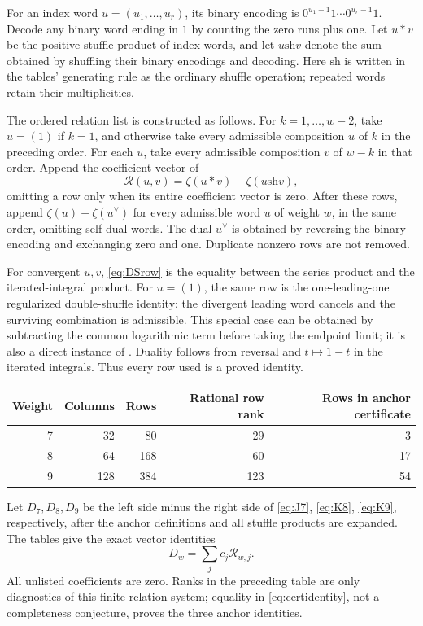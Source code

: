 \documentclass[11pt,letterpaper]{article}
\numberwithin{equation}{section}
\theoremstyle{definition}\newtheorem{definition}[theorem]{Definition}
\theoremstyle{remark}\newtheorem{remark}[theorem]{Remark}
\newcommand{\sha}{\mathbin{\mathrm{sh}}}
\newcommand{\shuffle}{\mathrm{sh}}
\begin{document}
For an index word $u=(u_1,\ldots,u_r)$, its binary encoding is
$0^{u_1-1}1\cdots0^{u_r-1}1$. Decode any binary word ending in $1$
by counting the zero runs plus one. Let $u*v$ be the positive
stuffle product of index words, and let $u\sha v$ denote the sum
obtained by shuffling their binary encodings and decoding. Here
$\sha$ is written in the tables' generating rule as the ordinary
shuffle operation; repeated words retain their multiplicities.

The ordered relation list is constructed as follows. For
$k=1,\ldots,w-2$, take $u=(1)$ if $k=1$, and otherwise take every
admissible composition $u$ of $k$ in the preceding order. For each
$u$, take every admissible composition $v$ of $w-k$ in that order.
Append the coefficient vector of
\begin{equation}\label{eq:DSrow}
 \mathcal R(u,v)=\zeta(u*v)-\zeta(u\mathbin{\shuffle}v),
\end{equation}
omitting a row only when its entire coefficient vector is zero.
After these rows, append $\zeta(u)-\zeta(u^\vee)$ for every
admissible word $u$ of weight $w$, in the same order, omitting
self-dual words. The dual $u^\vee$ is obtained by reversing the
binary encoding and exchanging zero and one. Duplicate nonzero
rows are not removed.

For convergent $u,v$, \eqref{eq:DSrow} is the equality between
the series product and the iterated-integral product. For $u=(1)$,
the same row is the one-leading-one regularized double-shuffle
identity: the divergent leading word cancels and the surviving
combination is admissible. This special case can be obtained by
subtracting the common logarithmic term before taking the endpoint
limit; it is also a direct instance of \cite{IKZ}. Duality follows
from reversal and $t\mapsto1-t$ in the iterated integrals.
Thus every row used is a proved identity.

\begin{center}
\begin{tabular}{rrrrr}
\toprule
Weight & Columns & Rows & Rational row rank & Rows in anchor certificate\\
\midrule
7&32&80&29&3\\
8&64&168&60&17\\
9&128&384&123&54\\
\bottomrule
\end{tabular}
\end{center}

Let $D_7,D_8,D_9$ be the left side minus the right side of
\eqref{eq:J7}, \eqref{eq:K8}, \eqref{eq:K9}, respectively,
after the anchor definitions and all stuffle products are expanded.
The tables give the exact vector identities
\begin{equation}\label{eq:certidentity}
 D_w=\sum_j c_j\mathcal R_{w,j}.
\end{equation}
All unlisted coefficients are zero. Ranks in the preceding table
are only diagnostics of this finite relation system; equality in
\eqref{eq:certidentity}, not a completeness conjecture, proves
the three anchor identities.
\end{document}

